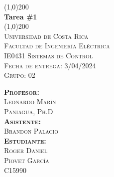 \begin{titlepage}    
    \begin{center}
        \line(1,0){200}\\
        [5mm]
        \huge{\bfseries Tarea \#1}\\
        \line(1,0){200}\\
        [2.5cm]
        \textsc{\Large Universidad de Costa Rica\\Facultad de Ingeniería Eléctrica\\IE0431 Sistemas de Control}\\
        \textsc{\Large Fecha de entrega: 3/04/2024}\\
        \textsc{\Large Grupo: 02}\\
        \vspace{1.5cm}
        \begin{flushleft}
            \textsc{\large
            \textbf{Profesor:}\\ Leonardo Marín\\ Paniagua, Ph.D\\[2mm]
            \textbf{Asistente:}\\ Brandon Palacio\\[2mm]
            \textbf{Estudiante:}\\ Roger Daniel\\Piovet García\\[2mm]C15990\\}
        \end{flushleft}
    \end{center}
\end{titlepage}
\restoregeometry

